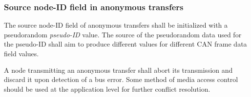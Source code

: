 \subsubsection{Source node-ID field in anonymous transfers}\label{sec:transport_can_source_node_pseudo_id}

The source node-ID field of anonymous transfers shall be initialized with a pseudorandom \emph{pseudo-ID} value.
The source of the pseudorandom data used for the pseudo-ID shall aim to produce different values
for different CAN frame data field values.

A node transmitting an anonymous transfer shall abort its transmission and discard it upon detection of a bus error.
Some method of media access control should be used at the application level for further conflict resolution.

